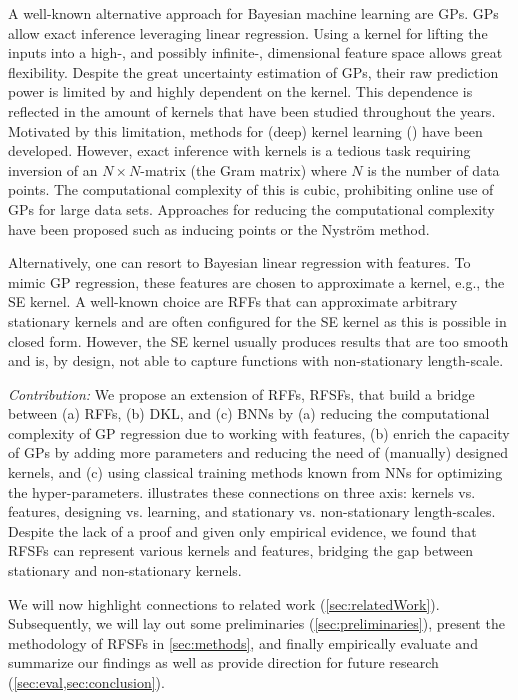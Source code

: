 A well-known alternative approach for Bayesian machine learning are \acp{GP}.
\aclp{GP} allow exact inference leveraging linear regression.
Using a kernel for lifting the inputs into a high-, and possibly infinite-, dimensional feature space allows great flexibility.
Despite the great uncertainty estimation of \acp{GP}, their raw prediction power is limited by and highly dependent on the kernel.
This dependence is reflected in the amount of kernels that have been studied throughout the years\cite[ch.\,2]{duvenaudAutomaticModelConstruction2014}.
Motivated by this limitation, methods for (deep) kernel learning () have been developed\cite{wilsonDeepKernelLearning2016,calandraManifoldGaussianProcesses2016,jacotNeuralTangentKernel2020}.
However, exact inference with kernels is a tedious task requiring inversion of an \(N \times N\)-matrix (the Gram matrix) where \(N\) is the number of data points.
The computational complexity of this is cubic, prohibiting online use of \acp{GP} for large data sets\cite{rahimiRandomFeaturesLargeScale2007}.
Approaches for reducing the computational complexity have been proposed such as inducing points\cite{snelsonSparseGaussianProcesses2005} or the Nyström method\cite{nystromUberPraktischeAuflosung1930,sunReviewNystromMethods2015}.

Alternatively, one can resort to Bayesian linear regression with features.
To mimic \ac{GP} regression, these features are chosen to approximate a kernel, e.g., the \ac{SE} kernel.
A well-known choice are \acp{RFF} that can approximate arbitrary stationary kernels and are often configured for the \ac{SE} kernel as this is possible in closed form\cite{rahimiRandomFeaturesLargeScale2007}.
However, the \ac{SE} kernel usually produces results that are too smooth\cite{steinInterpolationSpatialData1999} and is, by design, not able to capture functions with non-stationary length-scale.

\emph{Contribution:} We propose an extension of \acp{RFF}, \acp{RFSF}, that build a bridge between (a) \acp{RFF}, (b) \ac{DKL}, and (c) \acp{BNN} by (a) reducing the computational complexity of \ac{GP} regression due to working with features, (b) enrich the capacity of \acp{GP} by adding more parameters and reducing the need of (manually) designed kernels, and (c) using classical training methods known from \acp{NN} for optimizing the hyper-parameters.
 illustrates these connections on three axis: kernels vs. features, designing vs. learning, and stationary vs. non-stationary length-scales.
Despite the lack of a proof and given only empirical evidence, we found that \acp{RFSF} can represent various kernels and features, bridging the gap between stationary and non-stationary kernels.

We will now highlight connections to related work (\cref{sec:relatedWork}).
Subsequently, we will lay out some preliminaries (\cref{sec:preliminaries}), present the methodology of \acp{RFSF} in \cref{sec:methods}, and finally empirically evaluate and summarize our findings as well as provide direction for future research (\cref{sec:eval,sec:conclusion}).
